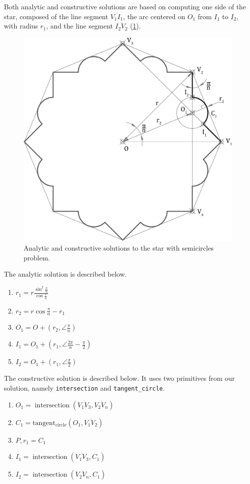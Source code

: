 Both analytic and constructive solutions are based on computing one side of the
star, composed of the line segment $\overline{V_1 I_1}$, the arc centered on
$O_1$ from $I_1$ to $I_2$, with radius $r_1$, and the line segment 
$\overline{I_2 V_2}$ (\cref{fig:eval.studies.star.sol}).

\begin{figure}[htb]
  \includegraphics[width=.7\linewidth]{fig/star-solution}
  \caption{\label{fig:eval.studies.star.sol}
    Analytic and constructive solutions to the star with semicircles problem.}%
\end{figure}

The analytic solution is described below.

\begin{enumerate}
  \item $r_1 = r\frac{\sin^2\frac{\pi}{n}}{\cos\frac{\pi}{n}}$
  \item $r_2 = r\cos\frac{\pi}{n} - r_1$
  \item $O_1 = O + \left(r_2, \angle\frac{\pi}{n}\right)$
  \item $I_1 = O_1 + \left(r_1, \angle\frac{2\pi}{n} - \frac{\pi}{2}\right)$
  \item $I_2 = O_1 + \left(r_1, \angle\frac{\pi}{2}\right)$
\end{enumerate}

The constructive solution is described below.  It uses two primitives from our
solution, namely \texttt{intersection} and \texttt{tangent\_circle}.

\begin{enumerate}
  \item $O_1 = \operatorname{intersection}\left(\overline{V_1 V_3},
  \overline{V_2 V_n}\right)$
  \item $C_1 = \operatorname{tangent_{circle}}\left(O_1, \overline{V_1
  V_2}\right)$
  \item $P,r_1 = C_1$
  \item $I_1 = \operatorname{intersection}\left(\overline{V_1 V_3}, C_1\right)$
  \item $I_2 = \operatorname{intersection}\left(\overline{V_2 V_n}, C_1\right)$
\end{enumerate}

